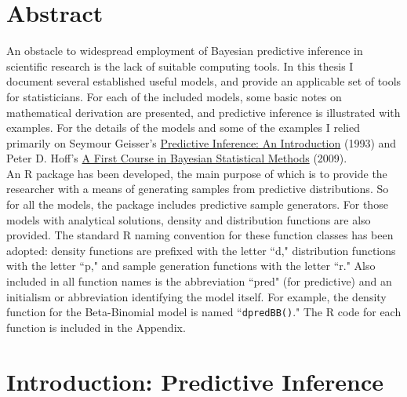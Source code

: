 \documentclass[12pt, a4paper]{article}
\begin{document}




\tableofcontents
\listoffigures
\newpage


\section{Abstract}

An obstacle to widespread employment of Bayesian predictive inference in scientific research is the lack of suitable computing tools.  In this thesis I document several established useful models, and provide an applicable set of tools for statisticians.  For each of the included models, some basic notes on mathematical derivation are presented, and predictive inference is illustrated with examples.  For the details of the models and some of the examples I relied primarily on Seymour Geisser's \underline{Predictive Inference:  An Introduction} (1993) and Peter D. Hoff's \underline{A First Course in Bayesian Statistical Methods} (2009).\\

\noindent An R package has been developed, the main purpose of which is to provide the researcher with a means of generating samples from predictive distributions.  So for all the models, the package includes predictive sample generators.  For those models with analytical solutions, density and distribution functions are also provided.  The standard R naming convention for these function classes has been adopted:  density functions are prefixed with the letter ``d," distribution functions with the letter ``p," and sample generation functions with the letter ``r."  Also included in all function names is the abbreviation ``pred" (for predictive) and an initialism or abbreviation identifying the model itself.  For example, the density function for the Beta-Binomial model is named ``\texttt{dpredBB()}."  The R code for each function is included in the Appendix.




\section{Introduction:  Predictive Inference}
\end{document}
